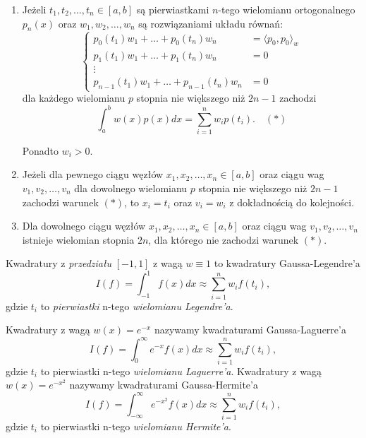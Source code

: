 \documentclass{article}
\begin{document}
\begin{enumerate}
    \item Jeżeli $t_1, t_2, \ldots, t_n \in [a, b]$ są pierwiastkami $n$-tego wielomianu ortogonalnego $p_n(x)$ oraz $w_1, w_2, \ldots, w_n$ są rozwiązaniami układu równań:
    \begin{equation*}
    \begin{cases}
        p_0(t_1) w_1 + \ldots + p_0(t_n) w_n &= \langle p_0, p_0 \rangle_{w} \\
        p_1(t_1) w_1 + \ldots + p_1(t_n) w_n &= 0 \\
        \vdots \\
        p_{n-1}(t_1) w_1 + \ldots + p_{n-1}(t_n) w_n &= 0
    \end{cases}
    \end{equation*}
\noindent
    dla każdego wielomianu $p$ stopnia nie większego niż $2n - 1$ zachodzi
    \begin{equation*}
    \int_{a}^{b} w(x)p(x)dx = \sum_{i=1}^{n} w_i p(t_i). \quad (*)
    \end{equation*}
    
    Ponadto $w_i > 0$.
    
    \item Jeżeli dla pewnego ciągu węzłów $x_1, x_2, \ldots, x_n \in [a, b]$ oraz ciągu wag $v_1, v_2, \ldots, v_n$ dla dowolnego wielomianu $p$ stopnia nie większego niż $2n - 1$ zachodzi warunek $(*)$, to $x_i = t_i$ oraz $v_i = w_i$ z dokładnością do kolejności.
    
    \item Dla dowolnego ciągu węzłów $x_1, x_2, \ldots, x_n \in [a, b]$ oraz ciągu wag $v_1, v_2, \ldots, v_n$ istnieje wielomian stopnia $2n$, dla którego nie zachodzi warunek $(*)$.
\end{enumerate}

\noindent
Kwadratury z \textit{przedziału} $[-1, 1]$ z wagą $w \equiv 1$ to kwadratury Gaussa-Legendre'a
\begin{equation*}
I(f) = \int_{-1}^{1} f(x) dx \approx \sum_{i=1}^{n} w_i f(t_i),
\end{equation*}
gdzie $t_i$ to \textit{pierwiastki} n-tego \textit{wielomianu Legendre'a}.

\noindent
Kwadratury z wagą $w(x) = e^{-x}$ nazywamy kwadraturami Gaussa-Laguerre'a
\begin{equation*}
I(f) = \int_{0}^{\infty} e^{-x} f(x) dx \approx \sum_{i=1}^{n} w_i f(t_i),
\end{equation*}
gdzie $t_i$ to pierwiastki n-tego \textit{wielomianu Laguerre'a}.
\noindent
Kwadratury z wagą $w(x) = e^{-x^2}$ nazywamy kwadraturami Gaussa-Hermite'a
\begin{equation*}
I(f) = \int_{-\infty}^{\infty} e^{-x^2} f(x) dx \approx \sum_{i=1}^{n} w_i f(t_i),
\end{equation*}
gdzie $t_i$ to pierwiastki n-tego \textit{wielomianu Hermite'a}.
\end{document}
